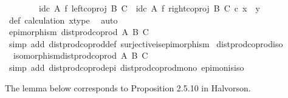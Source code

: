 \begin{isabellebody}
\ \ \ \ \ \ \ \ {\isacharparenleft}{\kern0pt}id\isactrlsub c\ A\ {\isasymtimes}\isactrlsub f\ left{\isacharunderscore}{\kern0pt}coproj\ B\ C{\isacharparenright}{\kern0pt}\ {\isasymamalg}\ {\isacharparenleft}{\kern0pt}id\isactrlsub c\ A\ {\isasymtimes}\isactrlsub f\ right{\isacharunderscore}{\kern0pt}coproj\ B\ C{\isacharparenright}{\kern0pt}\ {\isasymcirc}\isactrlsub c\ x\ {\isacharequal}{\kern0pt}\ y{\isachardoublequoteclose}\isanewline
\ \ \ \ \ \ \ \ \isamarkupfalse%
\ {\isasymphi}{\isacharunderscore}{\kern0pt}def\ calculation\ x{\isacharunderscore}{\kern0pt}type\ \isamarkupfalse%
\ auto\isanewline
\ \ \ \ \isamarkupfalse%
\isanewline
\ \ \isamarkupfalse%
\isanewline
\ \ \isamarkupfalse%
\ \isamarkupfalse%
\ {\isachardoublequoteopen}epimorphism\ {\isacharparenleft}{\kern0pt}dist{\isacharunderscore}{\kern0pt}prod{\isacharunderscore}{\kern0pt}coprod\ A\ B\ C{\isacharparenright}{\kern0pt}{\isachardoublequoteclose}\isanewline
\ \ \ \ \isamarkupfalse%
\ {\isacharparenleft}{\kern0pt}simp\ add{\isacharcolon}{\kern0pt}\ dist{\isacharunderscore}{\kern0pt}prod{\isacharunderscore}{\kern0pt}coprod{\isacharunderscore}{\kern0pt}def\ surjective{\isacharunderscore}{\kern0pt}is{\isacharunderscore}{\kern0pt}epimorphism{\isacharparenright}{\kern0pt}\isanewline
{}\isamarkupfalse%
%
\endisatagproof
{\isafoldproof}%
%
\isadelimproof
\isanewline
%
\endisadelimproof
\isanewline
{}\isamarkupfalse%
\ dist{\isacharunderscore}{\kern0pt}prod{\isacharunderscore}{\kern0pt}coprod{\isacharunderscore}{\kern0pt}iso{\isacharcolon}{\kern0pt}\isanewline
\ \ {\isachardoublequoteopen}isomorphism{\isacharparenleft}{\kern0pt}dist{\isacharunderscore}{\kern0pt}prod{\isacharunderscore}{\kern0pt}coprod\ A\ B\ C{\isacharparenright}{\kern0pt}{\isachardoublequoteclose}\isanewline
%
\isadelimproof
\ \ %
\endisadelimproof
%
\isatagproof
{}\isamarkupfalse%
\ {\isacharparenleft}{\kern0pt}simp\ add{\isacharcolon}{\kern0pt}\ dist{\isacharunderscore}{\kern0pt}prod{\isacharunderscore}{\kern0pt}coprod{\isacharunderscore}{\kern0pt}epi\ dist{\isacharunderscore}{\kern0pt}prod{\isacharunderscore}{\kern0pt}coprod{\isacharunderscore}{\kern0pt}mono\ epi{\isacharunderscore}{\kern0pt}mon{\isacharunderscore}{\kern0pt}is{\isacharunderscore}{\kern0pt}iso{\isacharparenright}{\kern0pt}%
\endisatagproof
{\isafoldproof}%
%
\isadelimproof
%
\endisadelimproof
%
\begin{isamarkuptext}%
The lemma below corresponds to Proposition 2.5.10 in Halvorson.%

\end{isamarkuptext}
\end{isabellebody}
